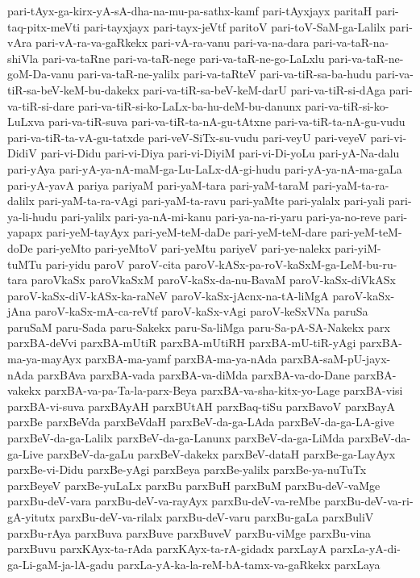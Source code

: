 {pari-tAyx-ga-kirx-yA-sA-dha-na-mu-pa-sathx-kamf
pari-tAyxjayx
paritaH
pari-taq-pitx-meVti
pari-tayxjayx
pari-tayx-jeVtf
paritoV
pari-toV-SaM-ga-Lalilx
pari-vAra
pari-vA-ra-va-gaRkekx
pari-vA-ra-vanu
pari-va-na-dara
pari-va-taR-na-shiVla
pari-va-taRne
pari-va-taR-nege
pari-va-taR-ne-go-LaLxlu
pari-va-taR-ne-goM-Da-vanu
pari-va-taR-ne-yalilx
pari-va-taRteV
pari-va-tiR-sa-ba-hudu
pari-va-tiR-sa-beV-keM-bu-dakekx
pari-va-tiR-sa-beV-keM-darU
pari-va-tiR-si-dAga
pari-va-tiR-si-dare
pari-va-tiR-si-ko-LaLx-ba-hu-deM-bu-danunx
pari-va-tiR-si-ko-LuLxva
pari-va-tiR-suva
pari-va-tiR-ta-nA-gu-tAtxne
pari-va-tiR-ta-nA-gu-vudu
pari-va-tiR-ta-vA-gu-tatxde
pari-veV-SiTx-su-vudu
pari-veyU
pari-veyeV
pari-vi-DidiV
pari-vi-Didu
pari-vi-Diya
pari-vi-DiyiM
pari-vi-Di-yoLu
pari-yA-Na-dalu
pari-yAya
pari-yA-ya-nA-maM-ga-Lu-LaLx-dA-gi-hudu
pari-yA-ya-nA-ma-gaLa
pari-yA-yavA
pariya
pariyaM
pari-yaM-tara
pari-yaM-taraM
pari-yaM-ta-ra-dalilx
pari-yaM-ta-ra-vAgi
pari-yaM-ta-ravu
pari-yaMte
pari-yalalx
pari-yali
pari-ya-li-hudu
pari-yalilx
pari-ya-nA-mi-kanu
pari-ya-na-ri-yaru
pari-ya-no-reve
pari-yapapx
pari-yeM-tayAyx
pari-yeM-teM-daDe
pari-yeM-teM-dare
pari-yeM-teM-doDe
pari-yeMto
pari-yeMtoV
pari-yeMtu
pariyeV
pari-ye-nalekx
pari-yiM-tuMTu
pari-yidu
paroV
paroV-cita
paroV-kASx-pa-roV-kaSxM-ga-LeM-bu-ru-tara
paroVkaSx
paroVkaSxM
paroV-kaSx-da-nu-BavaM
paroV-kaSx-diVkASx
paroV-kaSx-diV-kASx-ka-raNeV
paroV-kaSx-jAcnx-na-tA-liMgA
paroV-kaSx-jAna
paroV-kaSx-mA-ca-reVtf
paroV-kaSx-vAgi
paroV-keSxVNa
paruSa
paruSaM
paru-Sada
paru-Sakekx
paru-Sa-liMga
paru-Sa-pA-SA-Nakekx
parx
parxBA-deVvi
parxBA-mUtiR
parxBA-mUtiRH
parxBA-mU-tiR-yAgi
parxBA-ma-ya-mayAyx
parxBA-ma-yamf
parxBA-ma-ya-nAda
parxBA-saM-pU-jayx-nAda
parxBAva
parxBA-vada
parxBA-va-diMda
parxBA-va-do-Dane
parxBA-vakekx
parxBA-va-pa-Ta-la-parx-Beya
parxBA-va-sha-kitx-yo-Lage
parxBA-visi
parxBA-vi-suva
parxBAyAH
parxBUtAH
parxBaq-tiSu
parxBavoV
parxBayA
parxBe
parxBeVda
parxBeVdaH
parxBeV-da-ga-LAda
parxBeV-da-ga-LA-give
parxBeV-da-ga-Lalilx
parxBeV-da-ga-Lanunx
parxBeV-da-ga-LiMda
parxBeV-da-ga-Live
parxBeV-da-gaLu
parxBeV-dakekx
parxBeV-dataH
parxBe-ga-LayAyx
parxBe-vi-Didu
parxBe-yAgi
parxBeya
parxBe-yalilx
parxBe-ya-nuTuTx
parxBeyeV
parxBe-yuLaLx
parxBu
parxBuH
parxBuM
parxBu-deV-vaMge
parxBu-deV-vara
parxBu-deV-va-rayAyx
parxBu-deV-va-reMbe
parxBu-deV-va-ri-gA-yitutx
parxBu-deV-va-rilalx
parxBu-deV-varu
parxBu-gaLa
parxBuliV
parxBu-rAya
parxBuva
parxBuve
parxBuveV
parxBu-viMge
parxBu-vina
parxBuvu
parxKAyx-ta-rAda
parxKAyx-ta-rA-gidadx
parxLayA
parxLa-yA-di-ga-Li-gaM-ja-lA-gadu
parxLa-yA-ka-la-reM-bA-tamx-va-gaRkekx
parxLaya
}
